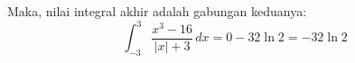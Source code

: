 \documentclass[11pt,openany,a4paper]{article}
\begin{document}
\begin{enumerate}
        Maka, nilai integral akhir adalah gabungan keduanya:
        \[
          \int_{-3}^{3} \frac{x^3 - 16}{|x| + 3} \, dx = 0 - 32 \ln 2 = -32 \ln 2
        \]
\end{enumerate}
\end{document}
